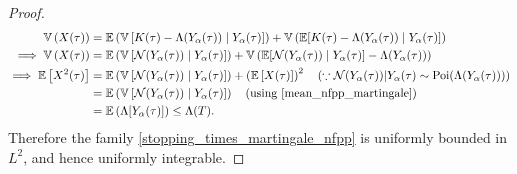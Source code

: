 \documentclass[11pt,oneside,reqno]{amsart}
\theoremstyle{definition}
\theoremstyle{remarkstyle}
\begin{document}
\begin{proof}
\begin{align*}
    \mathbb{V}\left(X(\tau)\right)&=\mathbb{E}\left(\mathbb{V}\left[K(\tau)-\Lambda(Y_{\alpha}(\tau))\mid Y_\alpha(\tau)\right]\right)
+\mathbb{V}\left(\mathbb{E}[K(\tau)-\Lambda(Y_{\alpha}(\tau))\mid Y_\alpha(\tau)]\right)\\
\implies\mathbb{V}\left(X(\tau)\right)&=\mathbb{E}\left(\mathbb{V}\left[\mathcal{N}(Y_\alpha(\tau))\mid Y_\alpha(\tau)\right]\right)+\mathbb{V}\left(\mathbb{E}[\mathcal{N}(Y_\alpha(\tau))\mid Y_\alpha(\tau)]-\Lambda(Y_{\alpha}(\tau))\right)\\
    \implies\mathbb{E}\left[X^2(\tau)\right]
&=\mathbb{E}\left(\mathbb{V}\left[\mathcal{N}(Y_\alpha(\tau))\mid Y_\alpha(\tau)\right]\right)+\left(\mathbb{E}\left[X(\tau)\right]\right)^2\quad(\because\mathcal{N}(Y_\alpha(\tau))|Y_\alpha(\tau)\sim \text{Poi}(\Lambda(Y_\alpha(\tau))))\\
&=\mathbb{E}\left(\mathbb{V}\left[\mathcal{N}(Y_\alpha(\tau))\mid Y_\alpha(\tau)\right]\right)\quad(\text{using}~\eqref{mean_nfpp_martingale})\\
&=\mathbb{E}\left(\Lambda[Y_\alpha(\tau)]\right)\le \Lambda(T).
\end{align*}
Therefore the family \eqref{stopping_times_martingale_nfpp} is uniformly bounded in $L^2$, and hence uniformly integrable.


\end{proof}
\end{document}
